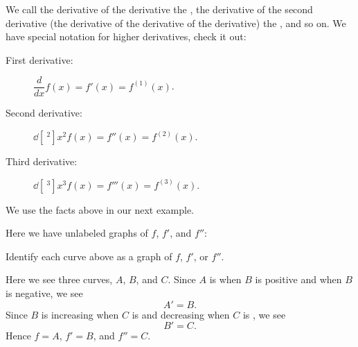 \documentclass{ximera}
\begin{document}
We call the derivative of the derivative the , the derivative of the second derivative (the derivative of the derivative of the derivative) the
, and so on. We have special notation for
higher derivatives, check it out:
\begin{description}
\item[First derivative:] $\dfrac{d}{dx} f(x) = f'(x) = f^{(1)}(x)$.
\item[Second derivative:] $\dd[~^2]{x^2} f(x) = f''(x) = f^{(2)}(x)$.
\item[Third derivative:] $\dd[~^3]{x^3} f(x) = f'''(x) = f^{(3)}(x)$.
\end{description}

We use the facts above in our next example.

\begin{example}
  Here we have unlabeled graphs of $f$, $f'$, and $f''$:
  \begin{image}
  \end{image}
  Identify each curve above as a graph of $f$, $f'$, or $f''$.
  \begin{explanation} 
    Here we see three curves, $A$, $B$, and $C$. Since $A$ is
     when $B$ is
    positive and
    when $B$ is negative, we see
    \[
    A'=B.
    \]
    Since $B$ is increasing when $C$ is
     and decreasing when $C$ is
    , we see
    \[
    B'=C.
    \]
    Hence $f=A$, $f'=B$, and $f''=C$.
  \end{explanation}
\end{example}
\end{document}
